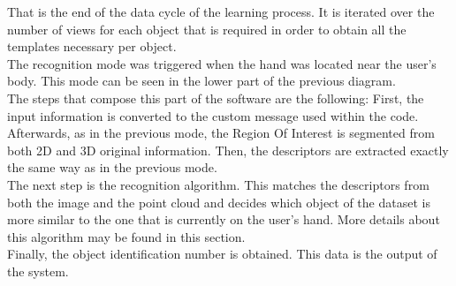 That is the end of the data cycle of the learning process. It is iterated over the number of views for each object that is required in order to obtain all the templates necessary per object. 
\\

The recognition mode was triggered when the hand was located near the user's body. This mode can be seen in the lower part of the previous diagram. 
\\

The steps that compose this part of the software are the following: 
First, the input information is converted to the custom message used within the code. Afterwards, as in the previous mode, the Region Of Interest is segmented from both 2D and 3D original information. Then, the descriptors are extracted exactly the same way as in the previous mode. 
\\

The next step is the recognition algorithm. This matches the descriptors from both the image and the point cloud and decides which object of the dataset is more similar to the one that is currently on the user's hand. More details about this algorithm may be found in this section. 
\\

Finally, the object identification number is obtained. This data is the output of the system. 

\newpage

\newpage

 




